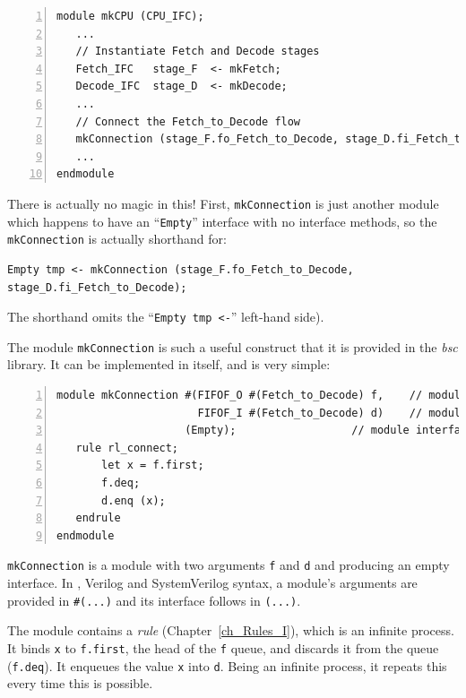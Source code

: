 {\footnotesize
\begin{Verbatim}[frame=single, numbers=left]
module mkCPU (CPU_IFC);
   ...
   // Instantiate Fetch and Decode stages
   Fetch_IFC   stage_F  <- mkFetch;
   Decode_IFC  stage_D  <- mkDecode;
   ...
   // Connect the Fetch_to_Decode flow
   mkConnection (stage_F.fo_Fetch_to_Decode, stage_D.fi_Fetch_to_Decode);
   ...
endmodule
\end{Verbatim}
}

There is actually no magic in this!  First, {\tt mkConnection} is just
another {\BSV} module which happens to have an ``\verb|Empty|'' interface
with no interface methods, so the \verb|mkConnection| is actually
shorthand for:

{\footnotesize
\begin{Verbatim}[frame=single]
   Empty tmp <- mkConnection (stage_F.fo_Fetch_to_Decode, stage_D.fi_Fetch_to_Decode);
\end{Verbatim}
}

The shorthand omits the ``{\tt Empty~tmp~<-}'' left-hand side).

The module \verb|mkConnection| is such a useful construct that it is
provided in the \emph{bsc} library.  It can be implemented in {\BSV}
itself, and is very simple:

{\footnotesize
\begin{Verbatim}[frame=single, numbers=left]
module mkConnection #(FIFOF_O #(Fetch_to_Decode) f,    // module argument
                      FIFOF_I #(Fetch_to_Decode) d)    // module argument
                    (Empty);                  // module interface
   rule rl_connect;
       let x = f.first;
       f.deq;
       d.enq (x);
   endrule
endmodule
\end{Verbatim}
}

{\tt mkConnection} is a module with two arguments {\tt f} and {\tt d}
and producing an empty interface.  In {\BSV}, Verilog and SystemVerilog
syntax, a module's arguments are provided in {\tt \#(...)} and its
interface follows in {\tt (...)}.


The module contains a \emph{rule} (Chapter~\ref{ch_Rules_I}), which is
an infinite process.  It binds {\tt x} to {\tt f.first}, the head of
the {\tt f} queue, and discards it from the queue ({\tt f.deq}).  It
enqueues the value {\tt x} into {\tt d}.  Being an infinite process,
it repeats this every time this is possible.

